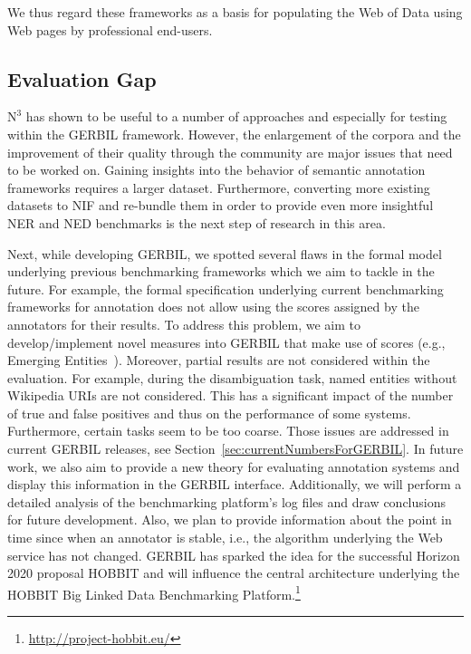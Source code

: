 We thus regard these frameworks as a basis for populating the Web of Data using Web pages by professional end-users.


\subsection*{Evaluation Gap}

$\mbox{N}^3$ has shown to be useful to a number of approaches and especially for testing within the GERBIL framework. 
However, the enlargement of the corpora and the improvement of their quality through the community are major issues that need to be worked on. 
Gaining insights into the behavior of semantic annotation frameworks requires a larger dataset.
Furthermore, converting more existing datasets to NIF and re-bundle them in order to provide even more insightful NER and NED benchmarks is the next step of research in this area.


Next, while developing GERBIL, we spotted several flaws in the formal model underlying previous benchmarking frameworks which we aim to tackle in the future. 
For example, the formal specification underlying current benchmarking frameworks for annotation does not allow using the scores assigned by the annotators for their results. 
To address this problem, we aim to develop/implement novel measures into GERBIL that make use of scores (e.g., Emerging Entities~\cite{Hoffart:2014:DEE:2566486.2568003}).
Moreover, partial results are not considered within the evaluation. 
For example, during the disambiguation task, named entities without Wikipedia URIs are not considered. 
This has a significant impact of the number of true and false positives and thus on the performance of some systems.
Furthermore, certain tasks seem to be too coarse. 
Those issues are addressed in current GERBIL releases, see Section~\ref{sec:currentNumbersForGERBIL}. 
In future work, we also aim to provide a new theory for evaluating annotation systems and display this information in the GERBIL interface.
Additionally, we will perform a detailed analysis of the benchmarking platform's log files and draw conclusions for future development.
Also, we plan to provide information about the point in time since when an annotator is stable, i.e., the algorithm underlying the Web service has not changed.
GERBIL has sparked the idea for the successful Horizon 2020 proposal HOBBIT and will influence the central architecture underlying the HOBBIT Big Linked Data Benchmarking Platform.\footnote{\url{http://project-hobbit.eu/}} 


